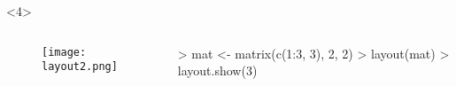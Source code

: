 \begin{frame}[t, fragile]{\subsecname}{}
\begin{overlayarea}{\textwidth}{\textheight}
\begin{onlyenv}<4>
      \begin{columns}
        \begin{column}{.4\textwidth}
          \begin{figure}
            \centering
            \texttt{[image: layout2.png]}
          \end{figure}
        \end{column}

        \begin{column}{.6\textwidth}
 \centering
\begin{rcode}
> mat <- matrix(c(1:3, 3), 2, 2)
> layout(mat)
> layout.show(3)
\end{rcode}
        \end{column}
      \end{columns}
\end{onlyenv}
\end{overlayarea}
\end{frame} 

